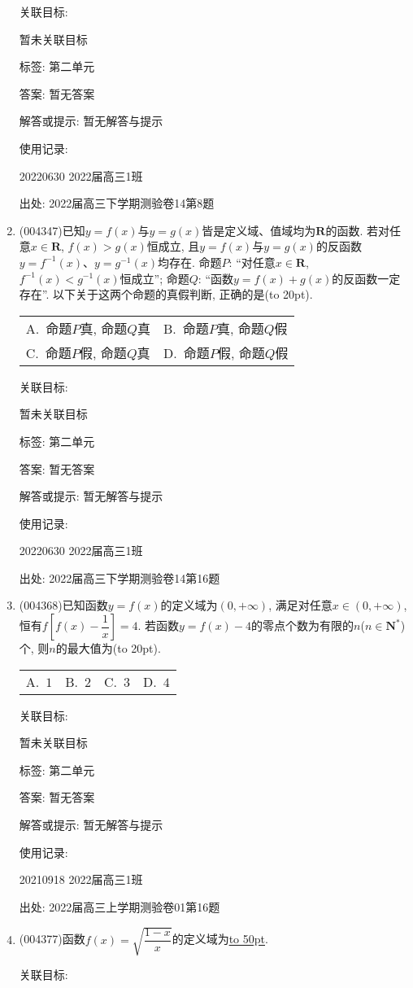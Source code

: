 \documentclass[10pt,a4paper]{article}
\newcommand{\blank}[1]{\underline{\hbox to #1pt{}}}
\newcommand{\bracket}[1]{(\hbox to #1pt{})}
\newcommand{\twoch}[4]{\par\begin{tabular}{p{.46\textwidth}p{.46\textwidth}}
A.~#1& B.~#2\\
C.~#3& D.~#4
\end{tabular}}
\newcommand{\fourch}[4]{\par\begin{tabular}{p{.23\textwidth}p{.23\textwidth}p{.23\textwidth}p{.23\textwidth}}
A.~#1 &B.~#2& C.~#3& D.~#4
\end{tabular}}
\begin{document}
\begin{enumerate}[1.]
关联目标:

暂未关联目标



标签: 第二单元

答案: 暂无答案

解答或提示: 暂无解答与提示

使用记录:

20220630	2022届高三1班	


出处: 2022届高三下学期测验卷14第8题
\item { (004347)}已知$y=f(x)$与$y=g(x)$皆是定义域、值域均为$\mathbf{R}$的函数. 若对任意$x\in \mathbf{R}$, $f(x)>g(x)$恒成立, 且$y=f(x)$与$y=g(x)$的反函数$y=f^{-1}(x)$、$y=g^{-1}(x)$均存在. 命题$P$: ``对任意$x\in \mathbf{R}$, $f^{-1}(x)<g^{-1}(x)$恒成立''; 命题$Q$: ``函数$y=f(x)+g(x)$的反函数一定存在''. 以下关于这两个命题的真假判断, 正确的是\bracket{20}.
\twoch{命题$P$真, 命题$Q$真}{命题$P$真, 命题$Q$假
}{命题$P$假, 命题$Q$真}{命题$P$假, 命题$Q$假}


关联目标:

暂未关联目标



标签: 第二单元

答案: 暂无答案

解答或提示: 暂无解答与提示

使用记录:

20220630	2022届高三1班	


出处: 2022届高三下学期测验卷14第16题
\item { (004368)}已知函数$y=f(x)$的定义域为$(0,+\infty)$, 满足对任意$x\in (0,+\infty)$, 恒有$f[f(x)-\dfrac 1x]=4$. 若函数$y=f(x)-4$的零点个数为有限的$n$($n\in \mathbf{N}^*$)个, 则$n$的最大值为\bracket{20}.
\fourch{$1$}{$2$}{$3$}{$4$}


关联目标:

暂未关联目标



标签: 第二单元

答案: 暂无答案

解答或提示: 暂无解答与提示

使用记录:

20210918	2022届高三1班	


出处: 2022届高三上学期测验卷01第16题
\item { (004377)}函数$f(x)=\sqrt{\dfrac{1-x}x}$的定义域为\blank{50}.


关联目标:


\end{enumerate}
\end{document}
